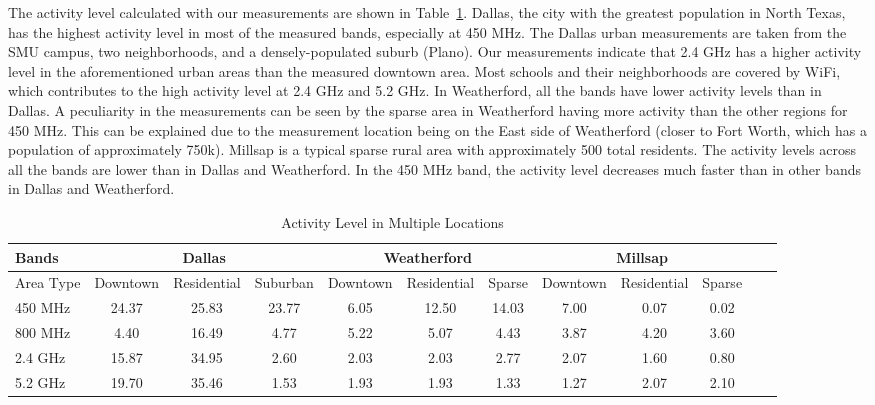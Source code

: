 The activity level calculated with our measurements are shown in Table~\ref{tab:activitymeasurement}. Dallas, the 
city with the greatest population in North Texas, has the highest activity level in most of the measured bands, 
especially at 450 MHz. The Dallas urban measurements are taken from the SMU campus, two neighborhoods, and a 
densely-populated suburb (Plano). Our measurements indicate that 2.4 GHz has a higher activity level in the aforementioned urban areas 
than the measured downtown area. Most schools and their neighborhoods are covered by WiFi, which contributes to the 
high activity level at 2.4 GHz and 5.2 GHz. In Weatherford, all the bands have lower activity levels than in Dallas. 
A peculiarity in the measurements can be seen by the sparse area in Weatherford having more activity than the other 
regions for 450 MHz. This can be explained due to the measurement location being on the East side of Weatherford (closer 
to Fort Worth, which has a population of approximately 750k). Millsap is a typical sparse rural area with approximately 
500 total residents. The activity levels across all the bands are lower than in Dallas and Weatherford. In the 450 MHz 
band, the activity level decreases much faster than in other bands in Dallas and Weatherford. 

\begin{table}
\centering %
\begin{tabular}{|l|c|c|c|c|c|c|c|c|c|c|c|} %
\hline %
Bands     & \multicolumn{3}{c|}{Dallas} & \multicolumn{3}{c|}{Weatherford} & \multicolumn{3}{c|}{Millsap} \\%
\hline %
Area Type & Downtown & Residential & Suburban & Downtown &  Residential & Sparse & Downtown & Residential & Sparse \\ %
\hline %
450 MHz &24.37	&25.83  &23.77	&6.05 &12.50  &14.03 & 7.00 & 0.07 & 0.02 \\      
\hline %
800 MHz &4.40 	&16.49  &4.77	&5.22&5.07 &4.43  & 3.87 & 4.20 & 3.60 \\      
\hline %
2.4 GHz &15.87 	&34.95  &2.60	&2.03&2.03 &2.77  & 2.07 & 1.60 & 0.80 \\      
\hline %
5.2 GHz &19.70	&35.46  &1.53	&1.93&1.93 &1.33  & 1.27 & 2.07 & 2.10 \\      
\hline %
\end{tabular}    
\caption{Activity Level in Multiple Locations} %
\label{tab:activitymeasurement}    
\vspace{-0.3in}
\end{table}    


